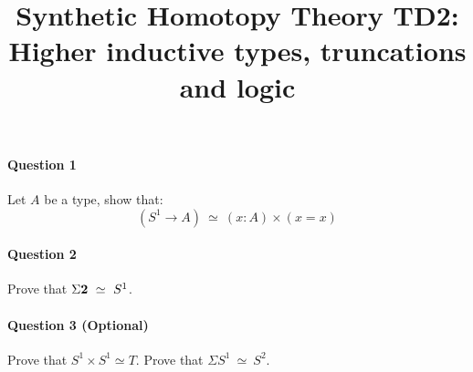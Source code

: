 \documentclass{article}[6pt]%
\title{Synthetic Homotopy Theory TD2: Higher inductive types, truncations and logic}
\newcommand{\U}{{\mathcal U}}
\renewcommand{\r}{\rightarrow}
\newcommand{\comment}[1]{}
\newcommand{\two}{{\bf 2}}
\newtheorem{ind_def}{Inductive Definition}
\begin{document}
\maketitle

\begin{Exercise}[title={Higher inductive types}]

\paragraph{Question 1} Let $A$ be a type, show that: 
\[(S^1\r A)\ \simeq\ (x:A)\times (x=x)\]

\paragraph{Question 2} Prove that $\Sigma \two \ \simeq \ S^1$. 

\paragraph{Question 3 (Optional)} Prove that $S^1\times S^1 \simeq T$. Prove that $\Sigma S^1 \ \simeq \ S^2$.
\end{Exercise}


\comment{

\begin{Exercise}[title={Quotients},difficulty=1]
Assume given $A:\U$ and $\_\sim\_:A\r A\r \U$.

\begin{ind_def}
TODO
\end{ind_def}

We give the dependent elimination principle for $A/_\sim$:

\paragraph{Question 1} Using univalence, prove that 
\[(A/_\sim \r \U)\ \sim\ (f:A\r \U)\times( (x,y:A)\r (p:x\sim y) \r f(x)\simeq f(y))\]

\vspace{0.6cm}

In the second part of the exercise, we want to show that UIP contradict TODO

\paragraph{Question 2} Prove that UIP contradicts the previous property. 
\end{Exercise}

}
\end{document}
